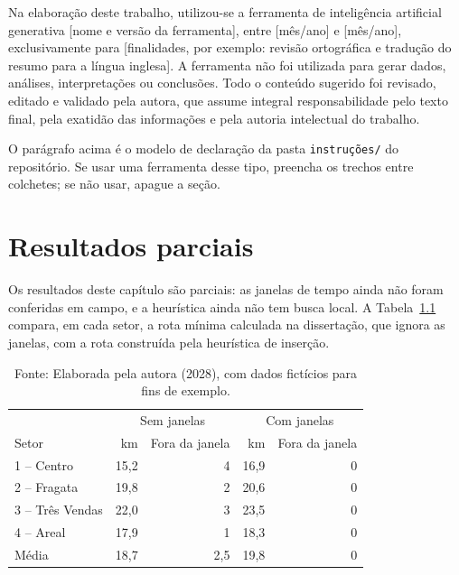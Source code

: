\documentclass[eq,capa]{texufpel}
\begin{document}
Na elaboração deste trabalho, utilizou-se a ferramenta de inteligência
artificial generativa [nome e versão da ferramenta], entre [mês/ano] e
[mês/ano], exclusivamente para [finalidades, por exemplo: revisão ortográfica
e tradução do resumo para a língua inglesa]. A ferramenta não foi utilizada
para gerar dados, análises, interpretações ou conclusões. Todo o conteúdo
sugerido foi revisado, editado e validado pela autora, que assume integral
responsabilidade pelo texto final, pela exatidão das informações e pela
autoria intelectual do trabalho.

O parágrafo acima é o modelo de declaração da pasta \texttt{instruções/} do
repositório. Se usar uma ferramenta desse tipo, preencha os trechos entre
colchetes; se não usar, apague a seção.

\chapter{Resultados parciais}
\label{cap:resultados}

Os resultados deste capítulo são parciais: as janelas de tempo ainda não foram
conferidas em campo, e a heurística ainda não tem busca local. A
Tabela~\ref{tab:resultados} compara, em cada setor, a rota mínima calculada
na dissertação, que ignora as janelas, com a rota construída pela heurística
de inserção.

\begin{table}[htbp]
  \caption{Distância e pontos atendidos fora da janela, por setor}
  \label{tab:resultados}
  \centering
  \begin{tabular}{lrrrr}
    \hline
                     & \multicolumn{2}{c}{Sem janelas} & \multicolumn{2}{c}{Com janelas} \\
    Setor            & km   & Fora da janela & km   & Fora da janela \\
    \hline
    1 -- Centro      & 15,2 & 4   & 16,9 & 0 \\
    2 -- Fragata     & 19,8 & 2   & 20,6 & 0 \\
    3 -- Três Vendas & 22,0 & 3   & 23,5 & 0 \\
    4 -- Areal       & 17,9 & 1   & 18,3 & 0 \\
    \hline
    Média            & 18,7 & 2,5 & 19,8 & 0 \\
    \hline
  \end{tabular}
  \caption*{Fonte: Elaborada pela autora (2028), com dados fictícios para fins de exemplo.}
\end{table}
\end{document}
